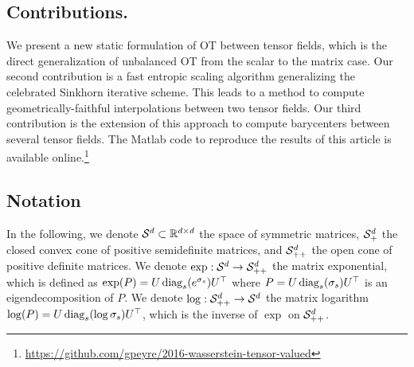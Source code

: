 

\subsection{Contributions.} 

We present a new static formulation of OT between tensor fields, which is the direct generalization of unbalanced OT from the scalar to the matrix case.
%
Our second contribution is a fast entropic scaling algorithm generalizing the celebrated Sinkhorn iterative scheme. This leads to a method to compute geometrically-faithful interpolations between two tensor fields. 
%
Our third contribution is the extension of this approach to compute barycenters between several tensor fields. 
%
The Matlab code to reproduce the results of this article is available online.\footnote{\url{https://github.com/gpeyre/2016-wasserstein-tensor-valued}} %

% 


\subsection{Notation}

In the following, we denote $\mathcal{S}^d \subset \mathbb{R}^{d \times d}$ the space of symmetric matrices, $\mathcal{S}_+^d$ the closed convex cone of positive semidefinite matrices, and $\mathcal{S}_{++}^d$ the open cone of positive definite matrices. 
%
We denote $\exp: \mathcal{S}^d \to \mathcal{S}_{++}^d$ the matrix exponential, which is defined as $\exp(P)=U \operatorname{diag}_s(e^{\sigma_s})U^\top$ where $P=U \operatorname{diag}_s(\sigma_s) U^\top$ is an eigendecomposition of $P$.
We denote $\log: \mathcal{S}_{++}^d \to \mathcal{S}^d$ the matrix logarithm $\log(P)=U \operatorname{diag}_s(\log \sigma_s)U^\top$, which is the inverse of $\exp$ on $\mathcal{S}_{++}^d$. %


